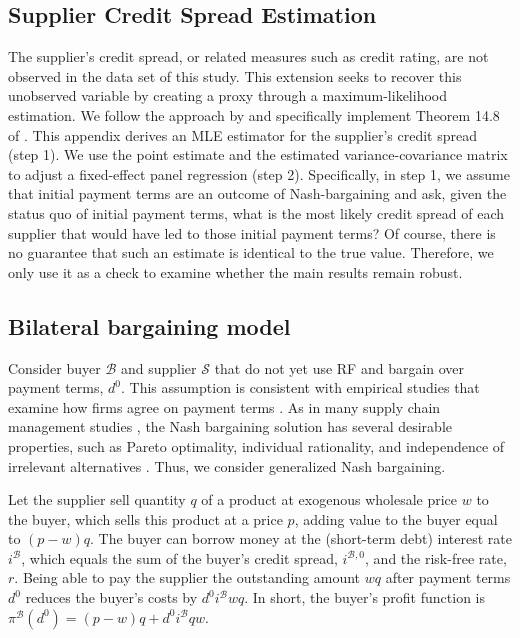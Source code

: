 \documentclass[A4,11pt]{article}
\newcommand{\bx}{\mathcal B}
\renewcommand{\~}[1]{\tilde{#1}}
\renewcommand{\-}[1]{\overline{#1}}
\begin{document}
\begin{appendices}
\onehalfspacing
\section{Supplier Credit Spread Estimation}\label{app:creditSpread}
The supplier's credit spread, or related measures such as credit rating, are not observed in the data set of this study. This extension seeks to recover this unobserved variable by creating a proxy through a maximum-likelihood estimation. We follow the approach by \citep{murphy2002estimation} and specifically implement Theorem 14.8 of \citet{Greene2020}. This appendix derives an MLE estimator for the supplier's credit spread (step 1). We use the point estimate and the estimated variance-covariance matrix to adjust a fixed-effect panel regression (step 2). Specifically, in step 1,  we assume that initial payment terms are an outcome of Nash-bargaining and ask, given the status quo of initial payment terms, what is the most likely credit spread of each supplier that would have led to those initial payment terms? Of course, there is no guarantee that such an estimate is identical to the true value. Therefore, we only use it as a check to examine whether the main results remain robust.

\subsection{Bilateral bargaining model}
Consider buyer $\mathcal B$ and supplier $\mathcal S$ that do not yet use RF and bargain over payment terms, $d^0$. This assumption is consistent with empirical studies that examine how firms agree on payment terms \citep{Fabbri2016, Summers2002}. As in many supply chain management studies \citep{Bhaskaran2009, Plambeck2005, vanMieghem1999}, the Nash bargaining solution has several desirable properties, such as Pareto optimality, individual rationality, and independence of irrelevant alternatives \citep{Owen2013}. Thus, we consider generalized Nash bargaining. 

Let the supplier sell quantity $q$ of a product at exogenous wholesale price $w$ to the buyer, which sells this product at a price $p$, adding value to the buyer equal to $(p-w)q$. The buyer can borrow money at the (short-term debt) interest rate $i^{\bx}$, which equals the sum of the buyer's credit spread, $i^{\bx,0}$, and the risk-free rate, $r$. Being able to pay the supplier the outstanding amount $wq$ after payment terms $d^0$ reduces the buyer's costs by $d^0i^{\bx}wq$. In short, the buyer's profit function is $\pi^{\bx}\left(d^0\right)=(p-w)q+d^0i^{\bx}qw$.


\end{appendices}
\end{document}
